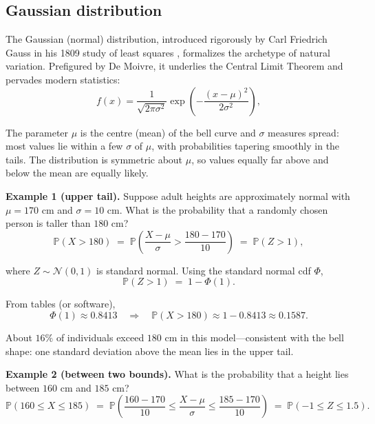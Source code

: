 \documentclass{book}
\begin{document}
\subsection*{Gaussian distribution}

The Gaussian (normal) distribution, introduced rigorously by Carl Friedrich Gauss in his 1809 study of least squares \cite{gauss-astronomy}, formalizes the archetype of natural variation. Prefigured by De Moivre, it underlies the Central Limit Theorem and pervades modern statistics:
\begin{equation}
	f(x) = \frac{1}{\sqrt{2\pi\sigma^2}} \exp\!\left( -\frac{(x-\mu)^2}{2\sigma^2} \right),
	\label{eq:gaussian}
\end{equation}

The parameter $\mu$ is the centre (mean) of the bell curve and $\sigma$ measures spread: most values lie within a few $\sigma$ of $\mu$, with probabilities tapering smoothly in the tails. The distribution is symmetric about $\mu$, so values equally far above and below the mean are equally likely.

\textbf{Example 1 (upper tail).} Suppose adult heights are approximately normal with $\mu=170$ cm and $\sigma=10$ cm. What is the probability that a randomly chosen person is taller than $180$ cm?
\begin{equation}
	\mathbb{P}(X>180) \;=\; \mathbb{P}\!\left(\frac{X-\mu}{\sigma} > \frac{180-170}{10}\right)
	\;=\; \mathbb{P}(Z>1),
\end{equation}

where $Z \sim \mathcal{N}(0,1)$ is standard normal. Using the standard normal cdf $\Phi$,
\begin{equation}
	\mathbb{P}(Z>1) \;=\; 1 - \Phi(1).
\end{equation}

From tables (or software),
\begin{equation}
	\Phi(1) \approx 0.8413 \quad \Rightarrow \quad \mathbb{P}(X>180) \approx 1 - 0.8413 \approx 0.1587.
\end{equation}

About $16\%$ of individuals exceed $180$ cm in this model—consistent with the bell shape: one standard deviation above the mean lies in the upper tail.

\textbf{Example 2 (between two bounds).} What is the probability that a height lies between $160$ cm and $185$ cm?
\begin{equation}
	\mathbb{P}(160 \le X \le 185) 
	\;=\; \mathbb{P}\!\left(\frac{160-170}{10} \le \frac{X-\mu}{\sigma} \le \frac{185-170}{10}\right)
	\;=\; \mathbb{P}(-1 \le Z \le 1.5).
\end{equation}
\end{document}
